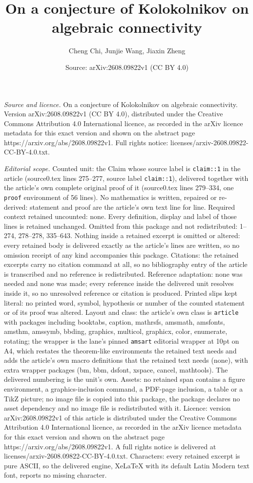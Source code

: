 \documentclass[10pt,a4paper]{amsart}
\title[On a conjecture of Kolokolnikov on algebraic connectivity]{On a conjecture of Kolokolnikov on algebraic connectivity}
\author{Cheng Chi, Junjie Wang, Jiaxin Zheng}
\date{Source: arXiv:2608.09822v1 (CC BY 4.0)}
\begin{document}
\maketitle

\noindent\emph{Source and licence.} On a conjecture of Kolokolnikov on algebraic connectivity. Version arXiv:2608.09822v1 (CC BY 4.0), distributed under the Creative Commons Attribution 4.0 International licence, as recorded in the arXiv licence metadata for this exact version and shown on the abstract page https://arxiv.org/abs/2608.09822v1. Full rights notice: licenses/arxiv-2608.09822-CC-BY-4.0.txt.\par\smallskip

\noindent\textit{Editorial scope.} Counted unit: the Claim whose source label is \texttt{claim::1} in the article (source0.tex lines 275--277, source label \texttt{claim::1}), delivered together with the article's own complete original proof of it (source0.tex lines 279--334, one \texttt{proof} environment of 56 lines). No mathematics is written, repaired or re-derived: statement and proof are the article's own text line for line. Required context retained uncounted: none. Every definition, display and label of those lines is retained unchanged. Omitted from this package and not redistributed: 1--274, 278--278, 335--643. Nothing inside a retained excerpt is omitted or altered: every retained body is delivered exactly as the article's lines are written, so no omission receipt of any kind accompanies this package. Citations: the retained excerpts carry no citation command at all, so no bibliography entry of the article is transcribed and no reference is redistributed. Reference adaptation: none was needed and none was made; every reference inside the delivered unit resolves inside it, so no unresolved reference or citation is produced. Printed slips kept literal: no printed word, symbol, hypothesis or number of the counted statement or of its proof was altered. Layout and class: the article's own class is \texttt{article} with packages including booktabs, caption, mathrsfs, amsmath, amsfonts, amsthm, amssymb, bbding, graphics, multicol, graphicx, color, enumerate, rotating; the wrapper is the lane's pinned \texttt{amsart} editorial wrapper at 10pt on A4, which restates the theorem-like environments the retained text needs and adds the article's own macro definitions that the retained text needs (none), with extra wrapper packages (bm, bbm, dsfont, xspace, cancel, mathtools). The delivered numbering is the unit's own. Assets: no retained span contains a figure environment, a graphics-inclusion command, a PDF-page inclusion, a table or a TikZ picture; no image file is copied into this package, the package declares no asset dependency and no image file is redistributed with it. Licence: version arXiv:2608.09822v1 of this article is distributed under the Creative Commons Attribution 4.0 International licence, as recorded in the arXiv licence metadata for this exact version and shown on the abstract page https://arxiv.org/abs/2608.09822v1. A full rights notice is delivered at licenses/arxiv-2608.09822-CC-BY-4.0.txt. Characters: every retained excerpt is pure ASCII, so the delivered engine, XeLaTeX with its default Latin Modern text font, reports no missing character.
\end{document}
